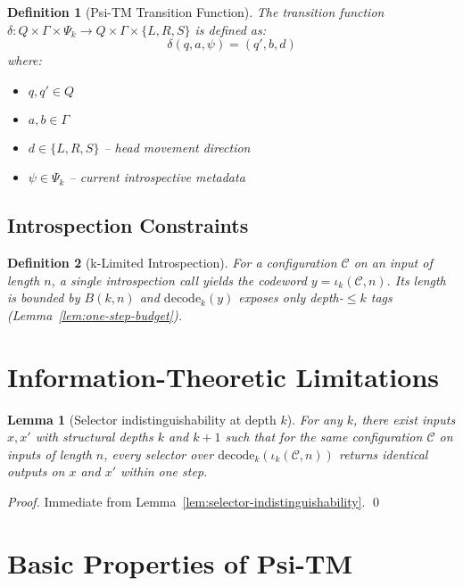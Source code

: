 \documentclass[11pt]{article}
\newtheorem{definition}{Definition}
\newtheorem{lemma}{Lemma}
\begin{document}
\begin{definition}[Psi-TM Transition Function]
The transition function $\delta: Q \times \Gamma \times \Psi_k \to Q \times \Gamma \times \{L, R, S\}$ is defined as:
$$\delta(q, a, \psi) = (q', b, d)$$
where:
\begin{itemize}
\item $q, q' \in Q$
\item $a, b \in \Gamma$
\item $d \in \{L, R, S\}$ -- head movement direction
\item $\psi \in \Psi_k$ -- current introspective metadata
\end{itemize}
\end{definition}

\subsection{Introspection Constraints}

\begin{definition}[k-Limited Introspection]
For a configuration $\mathcal{C}$ on an input of length $n$, a single introspection call yields the codeword $y=\iota_k(\mathcal{C},n)$. Its length is bounded by $B(k,n)$ and $\mathrm{decode}_k(y)$ exposes only depth-$\le k$ tags (Lemma~\ref{lem:one-step-budget}).
\end{definition}

\section{Information-Theoretic Limitations}

\begin{lemma}[Selector indistinguishability at depth $k$]
For any $k$, there exist inputs $x,x'$ with structural depths $k$ and $k{+}1$ such that for the same configuration $\mathcal{C}$ on inputs of length $n$, every selector over $\mathrm{decode}_k(\iota_k(\mathcal{C},n))$ returns identical outputs on $x$ and $x'$ within one step.
\end{lemma}

\begin{proof}
Immediate from Lemma~\ref{lem:selector-indistinguishability}. \qed
\end{proof}

\section{Basic Properties of Psi-TM}
\end{document}
